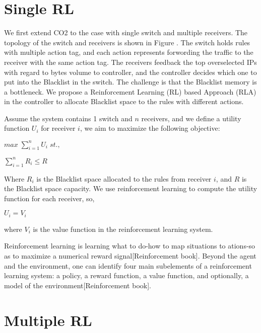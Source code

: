 \documentclass[a4paper,10pt]{article}
\title{}
\author{}
\begin{document}
\maketitle

\section{Single RL}
  We first extend CO2 to the case with single switch and multiple receivers. The topology of the switch and receivers is shown in Figure {}. The switch holds rules with multiple action tag, and each action represents forwording the traffic to the receiver with the same action tag. The receivers feedback the top overselected IPs with regard to bytes volume to controller, and the controller decides which one to put into the Blacklist in the switch. The challenge is that the Blacklist memory is a bottleneck. We propose a Reinforcement Learning (RL) based Approach (RLA) in the controller to allocate Blacklist space to the rules with different actions.

  Assume the system contains 1 switch and $n$ receivers, and we define a utility function $U_i$ for receiver $i$, we aim to maximize the following objective:
  
  $max \; \sum_{i = 1}^{n} U_i\;st.,$
  
  $\sum_{i = 1}^{n}R_i \leq R$
  
  Where $R_i$ is the Blacklist space allocated to the rules from receiver $i$, and $R$ is the Blacklist space capacity.
  We use reinforcement learning to compute the utility function for each receiver, so,
  
  $U_i = V_i$
  
  where $V_i$ is the value function in the reinforcement learning system. 
  
  Reinforcement learning is learning what to do-how to map situations to ations-so as to maximize a numerical reward signal[Reinforcement book]. Beyond the agent and the environment, one can identify four main subelements of a reinforcement learning system: a policy, a reward function, a value function, and optionally, a model of the environment[Reinforcement book]. 
  
\section{Multiple RL}
\end{document}
